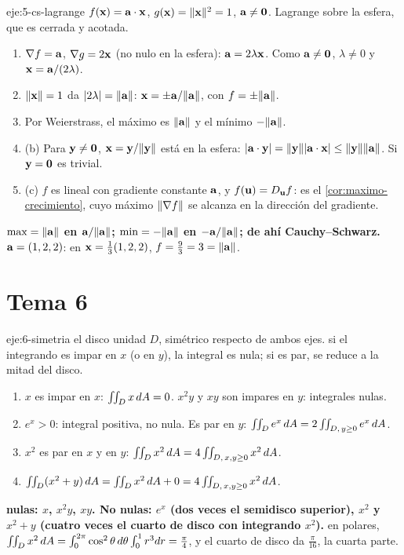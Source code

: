 \begin{solucion}{eje:5-cs-lagrange}
\datos $f(\mathbf{x})=\mathbf{a}\cdot\mathbf{x}$, $g(\mathbf{x})=\lVert\mathbf{x}\rVert^2=1$, $\mathbf{a}\neq\mathbf{0}$.
\planteamiento Lagrange sobre la esfera, que es cerrada y acotada.
\pasos
\begin{enumerate}[label=\arabic*.]
  \item $\nabla f=\mathbf{a}$, $\nabla g=2\mathbf{x}$ (no nulo en la esfera): $\mathbf{a}=2\lambda\mathbf{x}$. Como $\mathbf{a}\neq\mathbf{0}$, $\lambda\neq0$ y $\mathbf{x}=\mathbf{a}/(2\lambda)$.
  \item $\lVert\mathbf{x}\rVert=1$ da $\lvert2\lambda\rvert=\lVert\mathbf{a}\rVert$: $\mathbf{x}=\pm\mathbf{a}/\lVert\mathbf{a}\rVert$, con $f=\pm\lVert\mathbf{a}\rVert$.
  \item Por Weierstrass, el máximo es $\lVert\mathbf{a}\rVert$ y el mínimo $-\lVert\mathbf{a}\rVert$.
  \item (b) Para $\mathbf y\neq\mathbf{0}$, $\mathbf{x}=\mathbf y/\lVert\mathbf y\rVert$ está en la esfera: $\lvert\mathbf{a}\cdot\mathbf y\rvert=\lVert\mathbf y\rVert\lvert\mathbf{a}\cdot\mathbf{x}\rvert\le\lVert\mathbf y\rVert\lVert\mathbf{a}\rVert$. Si $\mathbf y=\mathbf{0}$ es trivial.
  \item (c) $f$ es lineal con gradiente constante $\mathbf{a}$, y $f(\mathbf{u})=D_{\mathbf{u}}f$: es el \cref{cor:maximo-crecimiento}, cuyo máximo $\lVert\nabla f\rVert$ se alcanza en la dirección del gradiente.
\end{enumerate}
\resultado \textbf{$\max=\lVert\mathbf{a}\rVert$ en $\mathbf{a}/\lVert\mathbf{a}\rVert$; $\min=-\lVert\mathbf{a}\rVert$ en $-\mathbf{a}/\lVert\mathbf{a}\rVert$; de ahí Cauchy--Schwarz.}
\comprobacion $\mathbf{a}=(1,2,2)$: en $\mathbf{x}=\frac13(1,2,2)$, $f=\frac{9}{3}=3=\lVert\mathbf{a}\rVert$.
\end{solucion}

\section{Tema 6}

\begin{solucion}{eje:6-simetria}
\datos el disco unidad $D$, simétrico respecto de ambos ejes.
\planteamiento si el integrando es impar en $x$ (o en $y$), la integral es nula; si es par, se reduce a la mitad del disco.
\pasos
\begin{enumerate}[label=\arabic*.]
  \item $x$ es impar en $x$: $\iint_Dx\,dA=0$. $x^2y$ y $xy$ son impares en $y$: integrales nulas.
  \item $e^x>0$: integral positiva, no nula. Es par en $y$: $\iint_De^x\,dA=2\iint_{D,\,y\ge0}e^x\,dA$.
  \item $x^2$ es par en $x$ y en $y$: $\iint_Dx^2\,dA=4\iint_{D,\,x,y\ge0}x^2\,dA$.
  \item $\iint_D(x^2+y)\,dA=\iint_Dx^2\,dA+0=4\iint_{D,\,x,y\ge0}x^2\,dA$.
\end{enumerate}
\resultado \textbf{nulas: $x$, $x^2y$, $xy$. No nulas: $e^x$ (dos veces el semidisco superior), $x^2$ y $x^2+y$ (cuatro veces el cuarto de disco con integrando $x^2$).}
\comprobacion en polares, $\iint_Dx^2\,dA=\int_0^{2\pi}\cos^2\theta\,d\theta\int_0^1r^3dr=\frac\pi4$, y el cuarto de disco da $\frac\pi{16}$, la cuarta parte.
\end{solucion}

